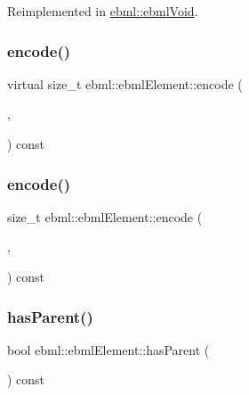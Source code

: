 Reimplemented in \mbox{\hyperlink{classebml_1_1ebmlVoid_ac822d7bf461ef44812596a34cccb134a}{ebml\+::ebml\+Void}}.

\mbox{\label{classebml_1_1ebmlElement_ad7db3756561ab4936492146597b1a0f2}} 
\subsubsection{\texorpdfstring{encode()}{encode()}\hspace{0.1cm}{\footnotesize\ttfamily [4/5]}}
{\footnotesize\ttfamily virtual size\+\_\+t ebml\+::ebml\+Element\+::encode (\begin{DoxyParamCaption}\item[{\mbox{\hyperlink{classebml_1_1ioBase}{io\+Base}} $\ast$}]{,  }\item[{off\+\_\+t}]{ }\end{DoxyParamCaption}) const\hspace{0.3cm}{\ttfamily [virtual]}}

\mbox{\label{classebml_1_1ebmlElement_a90dcd3bd8e37160b21b9faed3cecd49c}} 
\subsubsection{\texorpdfstring{encode()}{encode()}\hspace{0.1cm}{\footnotesize\ttfamily [5/5]}}
{\footnotesize\ttfamily size\+\_\+t ebml\+::ebml\+Element\+::encode (\begin{DoxyParamCaption}\item[{char $\ast$}]{,  }\item[{size\+\_\+t}]{ }\end{DoxyParamCaption}) const}

\mbox{\label{classebml_1_1ebmlElement_a9a784c3c424216ecd4b320e2cfc713b2}} 
\subsubsection{\texorpdfstring{has\+Parent()}{hasParent()}}
{\footnotesize\ttfamily bool ebml\+::ebml\+Element\+::has\+Parent (\begin{DoxyParamCaption}{ }\end{DoxyParamCaption}) const}

